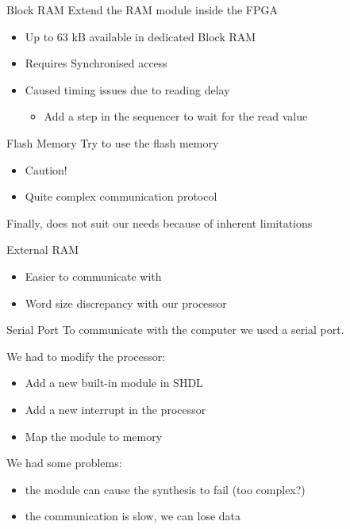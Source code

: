 \documentclass{beamer}
\begin{document}
      \begin{frame}{Block RAM}
        Extend the RAM module inside the FPGA
          \begin{itemize}
            \item Up to 63 kB available in dedicated Block RAM
            \item Requires Synchronised access
            \item Caused timing issues due to reading delay
                \begin{itemize}
                  \item Add a step in the sequencer to wait for the read value
                \end{itemize}
           \end{itemize}
      \end{frame}

      \begin{frame}{Flash Memory}
        Try to use the flash memory
        \begin{itemize}
          \item Caution!
          \item Quite complex communication protocol
        \end{itemize}
        \pause
        Finally, does not suit our needs because of inherent limitations
      \end{frame}

      \begin{frame}{External RAM}
        \begin{itemize}
          \item Easier to communicate with
          \item Word size discrepancy with our processor
        \end{itemize}
      \end{frame}

      \begin{frame}{Serial Port}
        To communicate with the computer we used a serial port.

        \pause
        We had to modify the processor:
        \begin{itemize}
          \item Add a new built-in module in SHDL
          \item Add a new interrupt in the processor
          \item Map the module to memory
        \end{itemize}

        \pause
        We had some problems:
        \begin{itemize}
          \item the module can cause the synthesis to fail (too complex?)
          \item the communication is slow, we can lose data
        \end{itemize}
      \end{frame}
\end{document}
